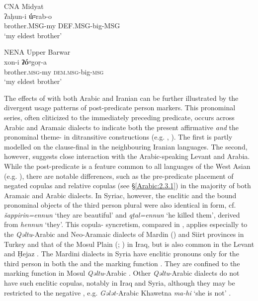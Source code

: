 \documentclass[output=paper,colorlinks,citecolor=brown,draftmode]{langscibook}
\begin{document}
\ea\label{Arabic:ex:64}
CNA Midyat \citep[11:§36]{Ritter1967Turoyo} \\
\gll ʔaḥun-i \textbf{ú꞊}rab-o \\
brother\textsc{.MSG-}my \textsc{DEF.MSG-}big\textsc{-MSG} \\
\glt `my eldest brother'
\z

\ea\label{Arabic:ex:65}
NENA Upper Barwar \citep[516.§2]{Talay2009NAKhaburAssyrer} \\
\gll xon-i \textbf{ʔó}꞊goṛ-a \\
brother\textsc{.msg-}my \textsc{dem.msg-}big\textsc{-msg} \\
\glt `my eldest brother'
\z


The effects of  with both Arabic and Iranian can be further illustrated by the divergent usage patterns of post-predicate person markers. This pronominal series, often cliticized to the immediately preceding predicate, occurs across Arabic and Aramaic dialects to indicate both the present affirmative  \textit{and} the pronominal theme- in ditransitive constructions (e.g. \citealt{Retso1987CopulaObject}, \citealt{Birnstiel2022CopulaKA}). The first is partly modelled on the clause-final  in the neighbouring Iranian languages. The second, however, suggests close interaction with the Arabic-speaking Levant and Arabia. While the post-predicate  is a feature common to all languages of the West Asian  (e.g. \citealt[404–405]{haig_western_2017}), there are notable differences, such as the pre-predicate placement of negated copulas and relative copulas (see §\ref{Arabic:2.3.1}) in the majority of both Aramaic and Arabic dialects. In Syriac, however, the enclitic  and the bound pronominal objects of the third person plural were also identical in form, cf. \textit{šappirin=ennun} `they are beautiful' and \textit{qṭal=ennun} `he killed them', derived from \textit{hennun} `they'. This copula- syncretism, compared in , applies especially to the \textit{Qəltu}-Arabic and Neo-Aramaic dialects of Mardin (\citet{Grigore2007AMArdin}) and Siirt provinces in Turkey and that of the Mosul Plain (\citealt{Jastrow1979AMosul}; \citealt{Khan2002Qaraqosh}) in Iraq, but is also common in the Levant and Ḥejaz \citep{Retso1987CopulaObject}. The Mardini dialects in Syria have enclitic pronouns only for the third person in both the  and the  marking function \citep{IsakssonLahdo2002ThreeBT}. They are confined to the  marking function in Mosul \textit{Qəltu}-Arabic \citep{Jastrow1979AMosul}. Other \textit{Qəltu}-Arabic dialects do not have such enclitic copulas, notably in Iraq and Syria, although they may be restricted to the negative , e.g. \textit{Gələt-}Arabic Khawetna \textit{ma-hi} `she is not' \citep[54–55]{Talay1999AKhawetnaG}.
    
\end{document}
